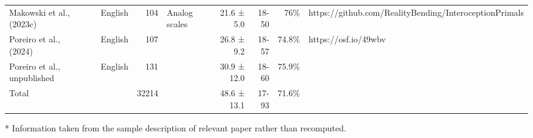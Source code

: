 \begin{table}
\begin{tabular*}{\linewidth}{@{\extracolsep{\fill}}lllrlrrrl}
Makowski et al., (2023c) &  & English & 104 & Analog scales & 21.6 ± 5.0 & 18-50 & 76\% & https://github.com/RealityBending/InteroceptionPrimals \\ 
Poreiro et al., (2024) &  & English & 107 &  & 26.8 ± 9.2 & 18-57 & 74.8\% & https://osf.io/49wbv \\ 
Poreiro et al., unpublished &  & English & 131 &  & 30.9 ± 12.0 & 18-60 & 75.9\% &  \\ 
Total &  &  & 32214 &  & 48.6 ± 13.1 & 17-93 & 71.6\% &  \\ 
\bottomrule
\end{tabular*}
\begin{minipage}{\linewidth}
* Information taken from the sample description of relevant paper rather than recomputed.\\
\end{minipage}
\end{table}

